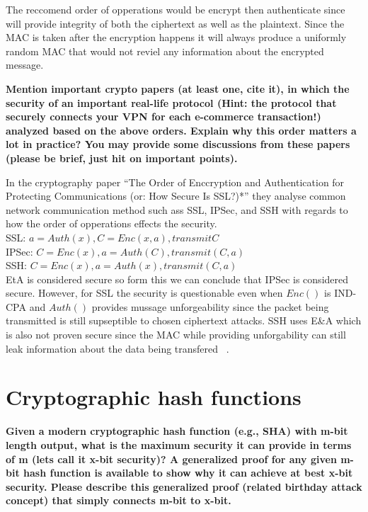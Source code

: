 \documentclass[letterpaper,11pt,notitlepage,fleqn]{article}
\begin{document}
The reccomend order of opperations would be encrypt then authenticate since will provide integrity of both the ciphertext as well as the plaintext. Since the MAC is taken after the encryption happens it will always produce a uniformly random MAC that would not reviel any information about the encrypted message. 

\noindent \textbf{Mention important crypto papers (at least one, cite it), in which the security of an important real-life  protocol  (Hint:  the  protocol  that  securely  connects  your  VPN  for  each  e-commerce transaction!)  analyzed  based  on  the  above  orders.  Explain  why  this  order  matters  a  lot  in practice?  You  may  provide  some  discussions  from  these  papers  (please  be  brief,  just  hit  on important points).}

In the cryptography paper ``The Order of Enccryption and Authentication for Protecting Communications (or: How Secure Is SSL?)*'' they analyse common network communication method such ass SSL, IPSec, and SSH with regards to how the order of opperations effects the security. \\
SSL: $a = Auth(x), C = Enc(x,a), transmit C$ \\ 
IPSec: $C = Enc(x), a = Auth(C), transmit (C,a)$ \\ 
SSH: $C = Enc(x), a = Auth(x), transmit (C,a)$ \\

EtA is considered secure so form this we can conclude that IPSec is considered secure. However, for SSL the security is questionable even when $Enc()$ is IND-CPA and $Auth()$ provides mussage unforgeability since the packet being transmitted is still supseptible to chosen ciphertext attacks. SSH uses E\&A which is also not proven secure since the MAC while providing unforgability can still leak information about the data being transfered ~\cite{krawczy}.
\section{Cryptographic  hash  functions}
\noindent \textbf{Given  a modern  cryptographic  hash  function  (e.g.,  SHA) with m-bit  length  output, what is  the maximum  security  it  can  provide  in  terms  of  m  (lets  call  it  x-bit  security)? A  generalized proof  for  any  given  m-bit  hash  function  is  available  to  show  why  it  can  achieve  at  best  x-bit security.  Please  describe  this  generalized  proof  (related  birthday  attack  concept)  that  simply connects m-bit to x-bit.}
\end{document}
